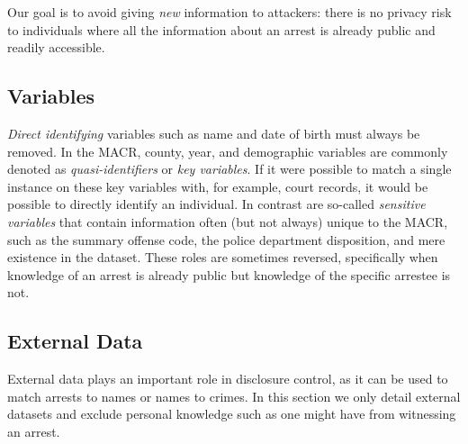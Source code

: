 \documentclass[]{article}
\begin{document}
Our goal is to avoid giving \emph{new} information to attackers: there
is no privacy risk to individuals where all the information about an
arrest is already public and readily accessible.

\subsection{Variables}\label{variables}

\emph{Direct identifying} variables such as name and date of birth must
always be removed. In the MACR, county, year, and demographic variables
are commonly denoted as \emph{quasi-identifiers} or \emph{key
variables}. If it were possible to match a single instance on these key
variables with, for example, court records, it would be possible to
directly identify an individual. In contrast are so-called
\emph{sensitive variables} that contain information often (but not
always) unique to the MACR, such as the summary offense code, the police
department disposition, and mere existence in the dataset. These roles
are sometimes reversed, specifically when knowledge of an arrest is
already public but knowledge of the specific arrestee is not.

\subsection{External Data}\label{external-data}

External data plays an important role in disclosure control, as it can
be used to match arrests to names or names to crimes. In this section we
only detail external datasets and exclude personal knowledge such as one
might have from witnessing an arrest.
\end{document}
